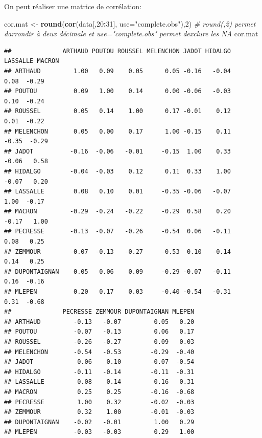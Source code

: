 \documentclass[
]{book}
\newenvironment{Shaded}{\begin{snugshade}}{\end{snugshade}}
\newcommand{\AttributeTok}[1]{\textcolor[rgb]{0.13,0.29,0.53}{#1}}
\newcommand{\CommentTok}[1]{\textcolor[rgb]{0.56,0.35,0.01}{\textit{#1}}}
\newcommand{\DecValTok}[1]{\textcolor[rgb]{0.00,0.00,0.81}{#1}}
\newcommand{\FunctionTok}[1]{\textcolor[rgb]{0.13,0.29,0.53}{\textbf{#1}}}
\newcommand{\NormalTok}[1]{#1}
\newcommand{\OtherTok}[1]{\textcolor[rgb]{0.56,0.35,0.01}{#1}}
\newcommand{\SpecialCharTok}[1]{\textcolor[rgb]{0.81,0.36,0.00}{\textbf{#1}}}
\newcommand{\StringTok}[1]{\textcolor[rgb]{0.31,0.60,0.02}{#1}}
\begin{document}
On peut réaliser une matrice de corrélation:

\begin{Shaded}
\begin{Highlighting}[]
\NormalTok{cor.mat }\OtherTok{\textless{}{-}} \FunctionTok{round}\NormalTok{(}\FunctionTok{cor}\NormalTok{(data[,}\DecValTok{20}\SpecialCharTok{:}\DecValTok{31}\NormalTok{], }\AttributeTok{use=}\StringTok{"complete.obs"}\NormalTok{),}\DecValTok{2}\NormalTok{) }\CommentTok{\# round(,2) permet d\textquotesingle{}arrondir à deux décimale et use="complete.obs" permet d\textquotesingle{}exclure les NA}
\NormalTok{cor.mat}
\end{Highlighting}
\end{Shaded}

\begin{verbatim}
##              ARTHAUD POUTOU ROUSSEL MELENCHON JADOT HIDALGO LASSALLE MACRON
## ARTHAUD         1.00   0.09    0.05      0.05 -0.16   -0.04     0.08  -0.29
## POUTOU          0.09   1.00    0.14      0.00 -0.06   -0.03     0.10  -0.24
## ROUSSEL         0.05   0.14    1.00      0.17 -0.01    0.12     0.01  -0.22
## MELENCHON       0.05   0.00    0.17      1.00 -0.15    0.11    -0.35  -0.29
## JADOT          -0.16  -0.06   -0.01     -0.15  1.00    0.33    -0.06   0.58
## HIDALGO        -0.04  -0.03    0.12      0.11  0.33    1.00    -0.07   0.20
## LASSALLE        0.08   0.10    0.01     -0.35 -0.06   -0.07     1.00  -0.17
## MACRON         -0.29  -0.24   -0.22     -0.29  0.58    0.20    -0.17   1.00
## PECRESSE       -0.13  -0.07   -0.26     -0.54  0.06   -0.11     0.08   0.25
## ZEMMOUR        -0.07  -0.13   -0.27     -0.53  0.10   -0.14     0.14   0.25
## DUPONTAIGNAN    0.05   0.06    0.09     -0.29 -0.07   -0.11     0.16  -0.16
## MLEPEN          0.20   0.17    0.03     -0.40 -0.54   -0.31     0.31  -0.68
##              PECRESSE ZEMMOUR DUPONTAIGNAN MLEPEN
## ARTHAUD         -0.13   -0.07         0.05   0.20
## POUTOU          -0.07   -0.13         0.06   0.17
## ROUSSEL         -0.26   -0.27         0.09   0.03
## MELENCHON       -0.54   -0.53        -0.29  -0.40
## JADOT            0.06    0.10        -0.07  -0.54
## HIDALGO         -0.11   -0.14        -0.11  -0.31
## LASSALLE         0.08    0.14         0.16   0.31
## MACRON           0.25    0.25        -0.16  -0.68
## PECRESSE         1.00    0.32        -0.02  -0.03
## ZEMMOUR          0.32    1.00        -0.01  -0.03
## DUPONTAIGNAN    -0.02   -0.01         1.00   0.29
## MLEPEN          -0.03   -0.03         0.29   1.00
\end{verbatim}
\end{document}

